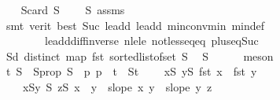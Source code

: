 \begin{isabellebody}
\ \ \isamarkupfalse%
\ S{}{}{\isacharcolon}{\kern0pt}{\isachardoublequoteopen}card\ S{}\ {\isasymge}\ {}{\isachardoublequoteclose}\ \isamarkupfalse%
\ S{}{\isacharparenleft}{\kern0pt}{}{\isacharparenright}{\kern0pt}\ assms{\isacharparenleft}{\kern0pt}{}{\isacharparenright}{\kern0pt}\isanewline
\ \ \ \ \isamarkupfalse%
\ {\isacharparenleft}{\kern0pt}smt\ {\isacharparenleft}{\kern0pt}verit{\isacharcomma}{\kern0pt}\ best{\isacharparenright}{\kern0pt}\ Suc{\isacharunderscore}{\kern0pt}{}\ le{\isacharunderscore}{\kern0pt}add{}\ le{\isacharunderscore}{\kern0pt}add{}\ min{\isacharunderscore}{\kern0pt}conv{\isacharunderscore}{\kern0pt}min\ min{\isacharunderscore}{\kern0pt}def\isanewline
\ \ \ \ \ \ \ \ le{\isacharunderscore}{\kern0pt}add{\isacharunderscore}{\kern0pt}diff{\isacharunderscore}{\kern0pt}inverse\ nle{\isacharunderscore}{\kern0pt}le\ not{\isacharunderscore}{\kern0pt}less{\isacharunderscore}{\kern0pt}eq{\isacharunderscore}{\kern0pt}eq\ plus{\isacharunderscore}{\kern0pt}{}{\isacharunderscore}{\kern0pt}eq{\isacharunderscore}{\kern0pt}Suc{\isacharparenright}{\kern0pt}\isanewline
\ \ \isamarkupfalse%
\ S{}d{\isacharcolon}{\kern0pt}\ {\isachardoublequoteopen}distinct\ {\isacharparenleft}{\kern0pt}map\ fst\ {\isacharparenleft}{\kern0pt}sorted{\isacharunderscore}{\kern0pt}list{\isacharunderscore}{\kern0pt}of{\isacharunderscore}{\kern0pt}set\ S{}{\isacharparenright}{\kern0pt}{\isacharparenright}{\kern0pt}{\isachardoublequoteclose}\ \isamarkupfalse%
\ S{}\isanewline
\ \ \ \ \isamarkupfalse%
\ meson\isanewline
\ \ \ \ \ \ \isanewline
\isanewline
\isanewline
\isanewline
\ \ \isamarkupfalse%
\ t\ S{}\ \ S{}{\isacharunderscore}{\kern0pt}prop{\isacharcolon}{\kern0pt}\ {\isachardoublequoteopen}S{}\ {\isacharequal}{\kern0pt}\ {\isacharparenleft}{\kern0pt}{\isasymlambda}p{\isachardot}{\kern0pt}\ p\ {\isacharplus}{\kern0pt}\ t{\isacharparenright}{\kern0pt}\ {\isacharbackquote}{\kern0pt}\ S{}t{\isachardoublequoteclose}\isanewline
\ \ \ \ {\isachardoublequoteopen}{\isasymforall}x{\isasymin}S{}{\isachardot}{\kern0pt}\ {\isasymforall}y{\isasymin}S{}{\isachardot}{\kern0pt}\ fst\ x\ {\isacharless}{\kern0pt}\ fst\ y{\isachardoublequoteclose}\isanewline
\ \ \ \ {\isachardoublequoteopen}{\isasymforall}x{\isasymin}S{}{\isachardot}{\kern0pt}{\isasymforall}y{\isasymin}\ S{}{\isachardot}{\kern0pt}\ {\isasymforall}z{\isasymin}S{}{\isachardot}{\kern0pt}\ x\ {\isacharless}{\kern0pt}\ y\ {\isasymlongrightarrow}\ slope\ x\ y\ {\isacharless}{\kern0pt}\ slope\ y\ z{\isachardoublequoteclose}\isanewline

\end{isabellebody}
